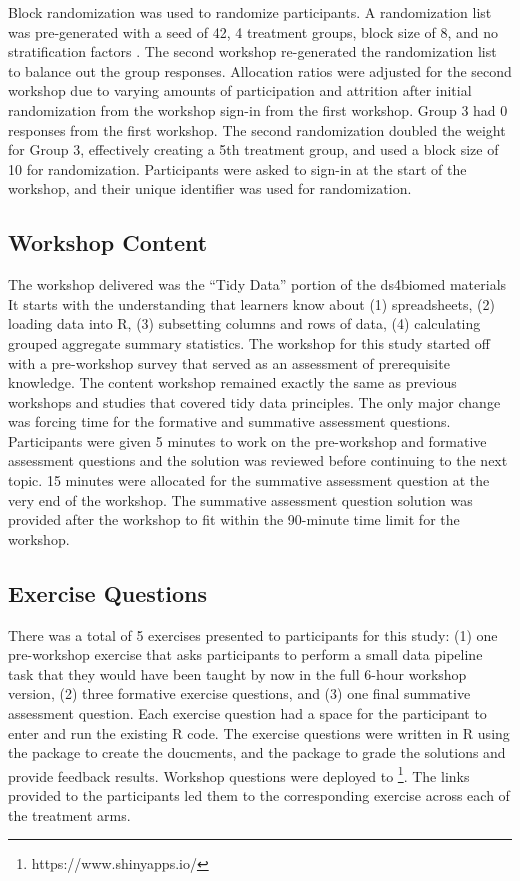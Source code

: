 \documentclass[040-assessment.tex]{subfiles}
\begin{document}
    Block randomization was used to randomize participants.
    A randomization list was pre-generated with a
    seed of 42, 4 treatment groups, block size of 8, and no stratification factors
    \cite{sealedenvelopeltdCreateBlockedRandomisation2021}.
    The second workshop re-generated the randomization list to balance out the group responses.
    Allocation ratios were adjusted for the second workshop due to varying amounts of participation
    and attrition after initial randomization from the workshop sign-in from the first workshop.
    Group 3 had 0 responses from the first workshop.
    The second randomization doubled the weight for Group 3,
    effectively creating a 5th treatment group, and used a block size of 10 for randomization.
    Participants were asked to sign-in at the start of the workshop,
    and their unique identifier was used for randomization.

\subsection{Workshop Content}

    The workshop delivered was  the ``Tidy Data'' portion of the ds4biomed materials %
    It starts with the understanding that learners know about
    (1) spreadsheets,
    (2) loading data into R,
    (3) subsetting columns and rows of data,
    (4) calculating grouped aggregate summary statistics.
    The workshop for this study started off with a pre-workshop survey that served as an assessment of
    prerequisite knowledge.
    The content workshop remained exactly the same as previous workshops and studies
    that covered tidy data principles.
    The only major change was forcing time for the formative and summative assessment questions.
    Participants were given 5 minutes to work on the pre-workshop and formative assessment questions
    and the solution was reviewed before continuing to the next topic.
    15 minutes were allocated for the summative assessment question at the very end of the workshop.
    The summative assessment question solution was provided after the workshop to fit within the
    90-minute time limit for the workshop.

\subsection{Exercise Questions}

There was a total of 5 exercises presented to participants for this study:
(1) one pre-workshop exercise that asks participants to perform a small data pipeline task that they would
    have been taught by now in the full 6-hour workshop version,
(2) three formative exercise questions, and
(3) one final summative assessment question.
Each exercise question had a space for the participant to enter and run the existing R code.
The exercise questions were written in R using the  package to create the doucments,
and the  package to grade the solutions and provide feedback results.
Workshop questions were deployed to \footnote{https://www.shinyapps.io/}.
The links provided to the participants led them to the corresponding exercise across each of the treatment arms.
\end{document}
